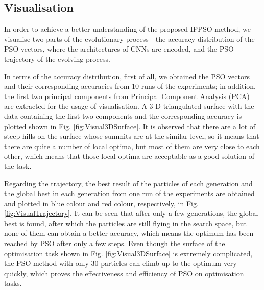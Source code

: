 \documentclass[conference]{IEEEtran}
\begin{document}
\subsection{Visualisation}\label{sec:Visulisation}

In order to achieve a better understanding of the proposed IPPSO method, we visualise two parts of the evolutionary process - the accuracy distribution of the PSO vectors, where the architectures of CNNs are encoded, and the PSO trajectory of the evolving process. 


In terms of the accuracy distribution, first of all, we obtained the PSO vectors and their corresponding accuracies from 10 runs of the experiments; in addition, the first two principal components from Principal Component Analysis (PCA) are extracted for the usage of visualisation. A 3-D triangulated surface with the data containing the first two components and the corresponding accuracy is plotted shown in Fig. \ref{fig:Visual3DSurface}. It is observed that there are a lot of steep hills on the surface whose summits are at the similar level, so it means that there are quite a number of local optima, but most of them are very close to each other, which means that those local optima are acceptable as a good solution of the task. 


Regarding the trajectory, the best result of the particles of each generation and the global best in each generation from one run of the experiments are obtained and plotted in blue colour and red colour, respectively, in Fig. \ref{fig:VisualTrajectory}. It can be seen that after only a few generations, the global best is found, after which the particles are still flying in the search space, but none of them can obtain a better accuracy, which means the optimum has been reached by PSO after only a few steps. Even though the surface of the optimisation task shown in Fig. \ref{fig:Visual3DSurface} is extremely complicated, the PSO method with only 30 particles can climb up to the optimum very quickly, which proves the effectiveness and efficiency of PSO on optimisation tasks. 

\end{document}
